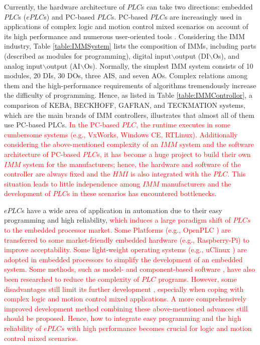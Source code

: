 \documentclass[journal,UTF8]{IEEEtran}
\begin{document}
	Currently, the hardware architecture of $PLC$s can take two directions: embedded $PLC$s ($ePLC$s) and PC-based $PLC$s. PC-based $PLC$s are increasingly used in applications of complex logic and motion control mixed scenarios on account of its high performance and numerous user-oriented tools \cite{Hossain2014Advanced}. Considering the IMM industry, Table \ref{table:IMMSystem} lists the composition of IMMs, including parts (described as modules for programming), digital input$\backslash$output (DI$\backslash$Os), and analog input$\backslash$output (AI$\backslash$Os). Normally, the simplest IMM system consists of 10 modules, 20 DIs, 30 DOs, three AIS, and seven AOs. Complex relations among them and the high-performance requirements of algorithms tremendously increase the difficulty of programming. Hence, as listed in Table \ref{table:IMMControllor}, a comparison of KEBA, BECKHOFF, GAFRAN, and TECKMATION systems, which are the main brands of IMM controllers, illustrates that almost all of them use PC-based PLCs. \textcolor{red}{In the PC-based $PLC$, the runtime executes in some cumbersome systems (e.g., VxWorks, Windows CE, RTLinux). Additionally considering the above-mentioned complexity of an $IMM$ system and the software architecture of PC-based $PLC$s, it has become a huge project to build their own $IMM$ system for the manufacturers; hence, the hardware and software of the controller are always fixed and the $HMI$ is also integrated with the $PLC$. This situation leads to little independence among $IMM$ manufacturers and the development of $PLC$s in these scenarios has encountered bottlenecks.}
	
	
	
	$ePLC$s have a wide area of application in automation due to their easy programming and high reliability, \textcolor{red}{which induces a large paradigm shift of $PLCs$ to the embedded processor market. Some Platforms (e.g., OpenPLC \cite{alves2014openplc}) are transferred to some market-friendly embedded hardware (e.g., Raspberry-Pi) to improve acceptability. Some light-weight operating systems (e.g., uClinux \cite{gaur2015operating}) are adopted in embedded processors to simplify the development of an embedded system. Some methods, such as model- and component-based software \cite{Bonf2013Design, Vyatkin2013Software}, have also been researched to reduce the complexity of $PLC$ programs.
		However, some disadvantages still limit its further development \cite{Hossain2014Advanced}, especially when coping with complex logic and motion control mixed applications. A more comprehensively improved development method combining these above-mentioned advances still should be proposed. Hence, how to integrate easy programming and the high reliability of $ePLCs$ with high performance becomes crucial for logic and motion control mixed scenarios.}
	
\end{document}
